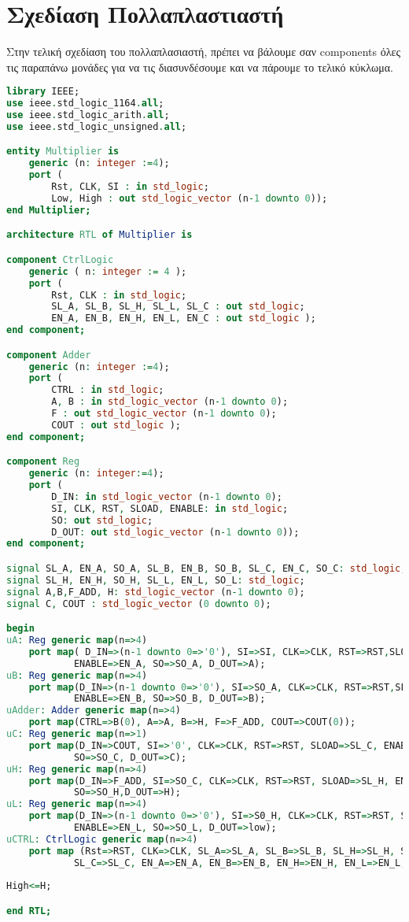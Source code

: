 \documentclass{article}
\begin{document}
\clearpage

\section{Σχεδίαση Πολλαπλαστιαστή}
Στην τελική σχεδίαση του πολλαπλασιαστή, πρέπει να βάλουμε σαν \foreignlanguage{english}{components} όλες τις παραπάνω μονάδες για να τις διασυνδέσουμε και να πάρουμε το τελικό κύκλωμα.


\begin{otherlanguage}{english}
\begin{lstlisting}[language=VHDL, caption= Multiplier Code VHDL]
library IEEE;
use ieee.std_logic_1164.all;
use ieee.std_logic_arith.all;
use ieee.std_logic_unsigned.all;

entity Multiplier is
	generic (n: integer :=4);
	port (
		Rst, CLK, SI : in std_logic;
		Low, High : out std_logic_vector (n-1 downto 0));
end Multiplier;

architecture RTL of Multiplier is

component CtrlLogic
	generic ( n: integer := 4 );
	port (
		Rst, CLK : in std_logic;
		SL_A, SL_B, SL_H, SL_L, SL_C : out std_logic;
		EN_A, EN_B, EN_H, EN_L, EN_C : out std_logic );
end component;

component Adder
	generic (n: integer :=4);
	port (
		CTRL : in std_logic;
		A, B : in std_logic_vector (n-1 downto 0);
		F : out std_logic_vector (n-1 downto 0);
		COUT : out std_logic );
end component;

component Reg
	generic (n: integer:=4);
	port (
		D_IN: in std_logic_vector (n-1 downto 0);
		SI, CLK, RST, SLOAD, ENABLE: in std_logic;
		SO: out std_logic;
		D_OUT: out std_logic_vector (n-1 downto 0));
end component;

signal SL_A, EN_A, SO_A, SL_B, EN_B, SO_B, SL_C, EN_C, SO_C: std_logic;
signal SL_H, EN_H, SO_H, SL_L, EN_L, SO_L: std_logic;
signal A,B,F_ADD, H: std_logic_vector (n-1 downto 0);
signal C, COUT : std_logic_vector (0 downto 0);

begin
uA: Reg generic map(n=>4)
	port map( D_IN=>(n-1 downto 0=>'0'), SI=>SI, CLK=>CLK, RST=>RST,SLOAD=>SL_A,
			ENABLE=>EN_A, SO=>SO_A, D_OUT=>A);
uB: Reg generic map(n=>4)
	port map(D_IN=>(n-1 downto 0=>'0'), SI=>SO_A, CLK=>CLK, RST=>RST,SLOAD=>SL_B,
			ENABLE=>EN_B, SO=>SO_B, D_OUT=>B);
uAdder: Adder generic map(n=>4)
	port map(CTRL=>B(0), A=>A, B=>H, F=>F_ADD, COUT=>COUT(0));
uC: Reg generic map(n=>1)
	port map(D_IN=>COUT, SI=>'0', CLK=>CLK, RST=>RST, SLOAD=>SL_C, ENABLE=>EN_C,
			SO=>SO_C, D_OUT=>C);
uH: Reg generic map(n=>4)
	port map(D_IN=>F_ADD, SI=>SO_C, CLK=>CLK, RST=>RST, SLOAD=>SL_H, ENABLE=>EN_H,
			SO=>SO_H,D_OUT=>H);
uL: Reg generic map(n=>4)
	port map(D_IN=>(n-1 downto 0=>'0'), SI=>S0_H, CLK=>CLK, RST=>RST, SLOAD=>SL_L,
			ENABLE=>EN_L, SO=>SO_L, D_OUT=>low);
uCTRL: CtrlLogic generic map(n=>4)
	port map (Rst=>RST, CLK=>CLK, SL_A=>SL_A, SL_B=>SL_B, SL_H=>SL_H, SL_L=>SL_L,
			SL_C=>SL_C, EN_A=>EN_A, EN_B=>EN_B, EN_H=>EN_H, EN_L=>EN_L, EN_C=>EN_C);
			
High<=H;

end RTL;
\end{lstlisting}
\end{otherlanguage}
\end{document}
